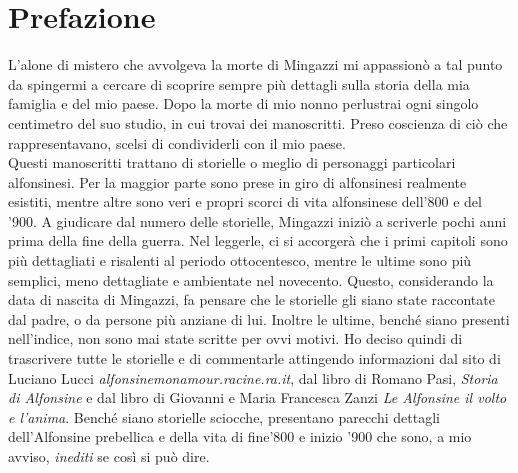 \thispagestyle{empty}
\chapter*{Prefazione}
L'alone di mistero che avvolgeva la morte di Mingazzi mi appassionò a tal punto da spingermi a cercare di scoprire sempre più dettagli sulla storia della mia famiglia e del mio paese. Dopo la morte di mio nonno perlustrai ogni singolo centimetro del suo studio, in cui trovai dei manoscritti. Preso coscienza di ciò che rappresentavano, scelsi di condividerli con il mio paese.
\\Questi manoscritti trattano di storielle o meglio di personaggi particolari alfonsinesi. Per la maggior parte sono prese in giro di alfonsinesi realmente esistiti, mentre altre sono veri e propri scorci di vita alfonsinese dell'800 e del '900. A giudicare dal numero delle storielle, Mingazzi iniziò a scriverle pochi anni prima della fine della guerra. Nel leggerle, ci si accorgerà che i primi capitoli sono più dettagliati e risalenti al periodo ottocentesco, mentre le ultime sono più semplici, meno dettagliate e ambientate nel novecento. Questo, considerando la data di nascita di Mingazzi, fa pensare che le storielle gli siano state raccontate dal padre, o da persone più anziane di lui. Inoltre le ultime, benché siano presenti nell'indice, non sono mai state scritte per ovvi motivi. Ho deciso quindi di trascrivere tutte le storielle e di commentarle attingendo informazioni dal sito di Luciano Lucci \emph{alfonsinemonamour.racine.ra.it}, dal libro di Romano Pasi, \emph{Storia di Alfonsine} e dal libro di Giovanni e Maria Francesca Zanzi \emph{Le Alfonsine il volto e l'anima}. Benché siano storielle sciocche, presentano parecchi dettagli dell'Alfonsine prebellica e della vita di fine'800 e inizio '900 che sono, a mio avviso, \emph{inediti} se così si può dire.
